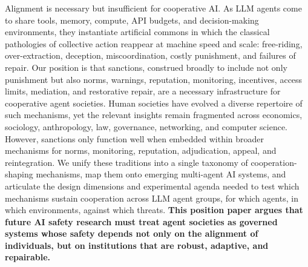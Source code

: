 

Alignment is necessary but insufficient for cooperative AI. As LLM agents come to share tools, memory, compute, API budgets, and decision-making environments, they instantiate artificial commons in which the classical pathologies of collective action reappear at machine speed and scale: free-riding, over-extraction, deception, miscoordination, costly punishment, and failures of repair. Our position is that sanctions, construed broadly to include not only punishment but also norms, warnings, reputation, monitoring, incentives, access limits, mediation, and restorative repair, are a necessary infrastructure for cooperative agent societies. Human societies have evolved a diverse repertoire of such mechanisms, yet the relevant insights remain fragmented across economics, sociology, anthropology, law, governance, networking, and computer science. However, sanctions only function well when embedded within broader mechanisms for norms, monitoring, reputation, adjudication, appeal, and reintegration. We unify these traditions into a single taxonomy of cooperation-shaping mechanisms, map them onto emerging multi-agent AI systems, and articulate the design dimensions and experimental agenda needed to test which mechanisms sustain cooperation across LLM agent groups, for which agents, in which environments, against which threats. \textbf{This position paper argues that future AI safety research must treat agent societies as governed systems whose safety depends not only on the alignment of individuals, but on institutions that are robust, adaptive, and repairable.}



